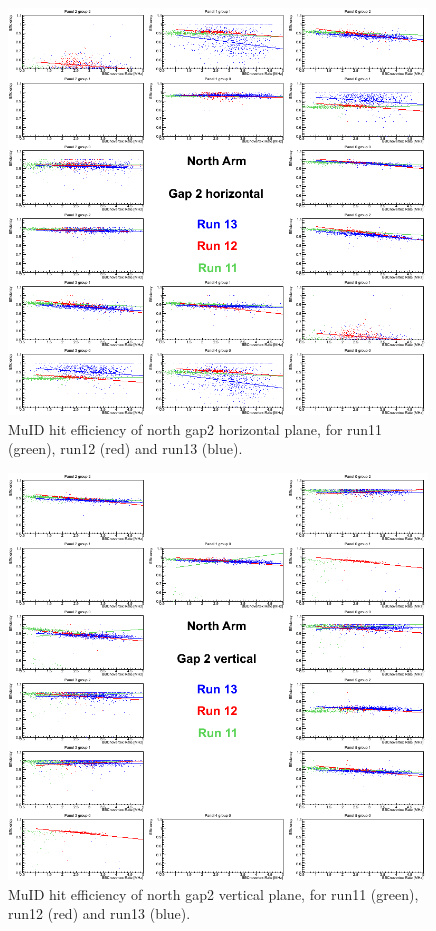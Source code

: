 \begin{figure}[h!]

  \centering
  \includegraphics[width=0.99\textwidth]{./figures/efficomp_North_gap2_horizontal.png}
  \caption{\label{Fig:efficiency:MuIdEff:a1g2p0}MuID hit efficiency of north gap2 horizontal plane, for run11 (green), run12 (red) and run13 (blue).}
\end{figure}
\clearpage


\begin{figure}[h!]

  \centering
  \includegraphics[width=0.99\textwidth]{./figures/efficomp_North_gap2_vertical.png}
  \caption{\label{Fig:efficiency:MuIdEff:a1g2p1}MuID hit efficiency of north gap2 vertical plane, for run11 (green), run12 (red) and run13 (blue).}
\end{figure}
\clearpage


